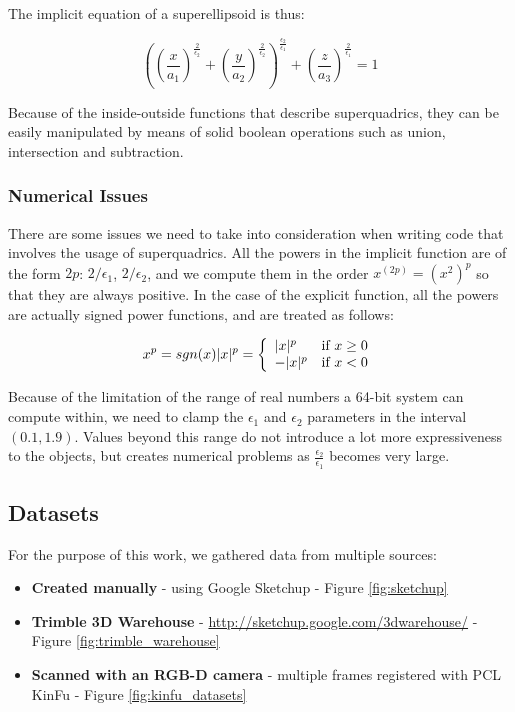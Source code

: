 \documentclass{article}
\begin{document}
The implicit equation of a superellipsoid is thus:

\begin{equation}
\left(\left(\frac{x}{a_1}\right)^{\frac{2}{\epsilon_2}} + \left(\frac{y}{a_2}\right)^{\frac{2}{\epsilon_2}}\right)^{\frac{\epsilon_2}{\epsilon_1}} + \left(\frac{z}{a_3}\right)^{\frac{2}{\epsilon_1}} =1
\end{equation}

Because of the inside-outside functions that describe superquadrics, they can be easily manipulated by means of solid boolean operations such as union, intersection and subtraction.

\subsubsection*{Numerical Issues}
There are some issues we need to take into consideration when writing code that involves the usage of superquadrics. All the powers in the implicit function are of the form $2p$: $2/\epsilon_1$, $2/\epsilon_2$, and we compute them in the order $x^{(2p)}=(x^2)^p$ so that they are always positive. In the case of the explicit function, all the powers are actually signed power functions, and are treated as follows:

\begin{equation}
x^p = sgn(x) |x|^p = \left\{
	\begin{array}{ll}
		|x|^p  & \textnormal{if } x \geq 0 \\
		-|x|^p & \textnormal{if } x < 0
	\end{array}
\right.
\end{equation}


Because of the limitation of the range of real numbers a 64-bit system can compute within, we need to clamp the $\epsilon_1$ and $\epsilon_2$ parameters in the interval $(0.1, 1.9)$. Values beyond this range do not introduce a lot more expressiveness to the objects, but creates numerical problems as $\frac{\epsilon_2}{\epsilon_1}$ becomes very large.

\subsection {Datasets}
For the purpose of this work, we gathered data from multiple sources:

\begin{itemize}
	\item{\textbf{Created manually} - using Google Sketchup - Figure \ref {fig:sketchup}}
	\item{\textbf{Trimble 3D Warehouse} - \url{http://sketchup.google.com/3dwarehouse/} - Figure \ref {fig:trimble_warehouse}}
	\item{\textbf{Scanned with an RGB-D camera} - multiple frames registered with PCL KinFu - Figure \ref{fig:kinfu_datasets}}
\end{itemize}
\end{document}
